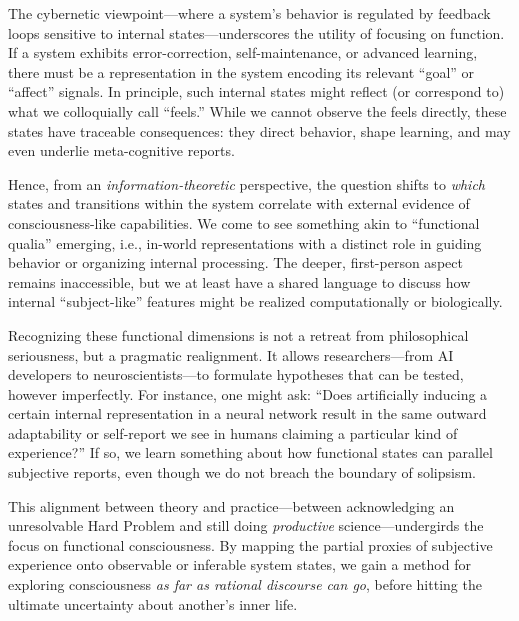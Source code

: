 \documentclass[12pt]{article}
\begin{document}

The cybernetic viewpoint---where a system's behavior is regulated by feedback loops sensitive to internal states---underscores the utility of focusing on function. If a system exhibits error-correction, self-maintenance, or advanced learning, there must be a representation in the system encoding its relevant ``goal'' or ``affect'' signals. In principle, such internal states might reflect (or correspond to) what we colloquially call ``feels.'' While we cannot observe the feels directly, these states have traceable consequences: they direct behavior, shape learning, and may even underlie meta-cognitive reports.

Hence, from an \textit{information-theoretic} perspective, the question shifts to \textit{which} states and transitions within the system correlate with external evidence of consciousness-like capabilities. We come to see something akin to ``functional qualia'' emerging, i.e., in-world representations with a distinct role in guiding behavior or organizing internal processing. The deeper, first-person aspect remains inaccessible, but we at least have a shared language to discuss how internal ``subject-like'' features might be realized computationally or biologically.


Recognizing these functional dimensions is not a retreat from philosophical seriousness, but a pragmatic realignment. It allows researchers---from AI developers to neuroscientists---to formulate hypotheses that can be tested, however imperfectly. For instance, one might ask: ``Does artificially inducing a certain internal representation in a neural network result in the same outward adaptability or self-report we see in humans claiming a particular kind of experience?'' If so, we learn something about how functional states can parallel subjective reports, even though we do not breach the boundary of solipsism.

This alignment between theory and practice---between acknowledging an unresolvable Hard Problem and still doing \textit{productive} science---undergirds the focus on functional consciousness. By mapping the partial proxies of subjective experience onto observable or inferable system states, we gain a method for exploring consciousness \textit{as far as rational discourse can go}, before hitting the ultimate uncertainty about another's inner life.
\end{document}
